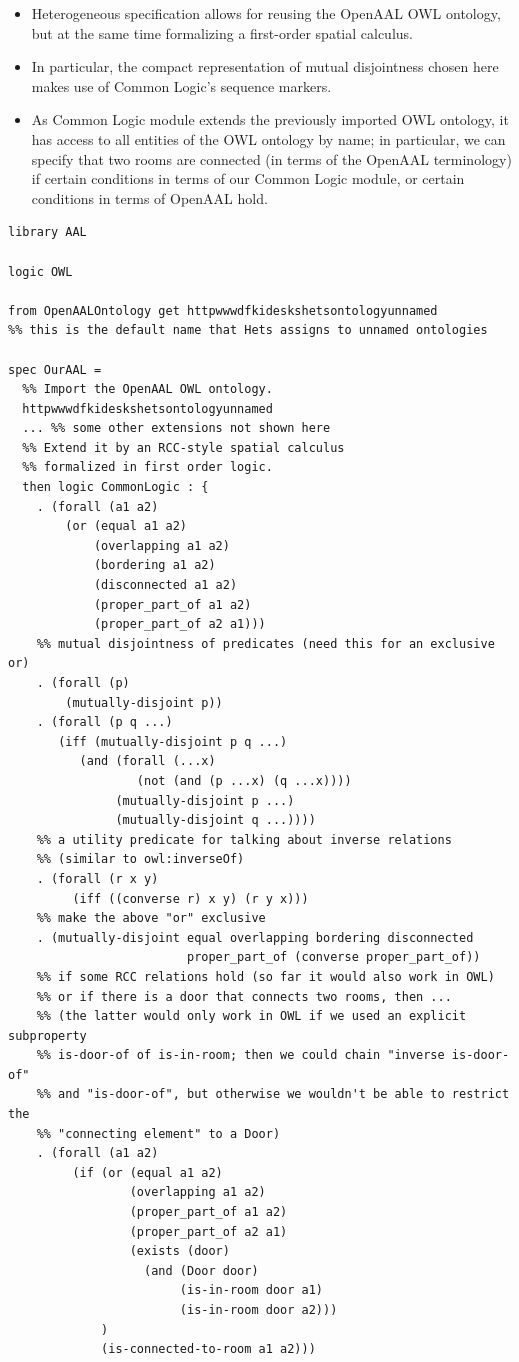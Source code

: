 \documentclass{article}
\begin{document}
\begin{itemize}
\item Heterogeneous specification allows for reusing the OpenAAL OWL ontology, but at the same time formalizing a first-order spatial calculus.
\item In particular, the compact representation of mutual disjointness chosen here makes use of Common Logic's sequence markers.
\item As Common Logic module extends the previously imported OWL ontology, it has access to all entities of the OWL ontology by name; in particular, we can specify that two rooms are connected (in terms of the OpenAAL terminology) if certain conditions in terms of our Common Logic module, or certain conditions in terms of OpenAAL hold.
\end{itemize}

\begin{lstlisting}[language=HetCASL,basicstyle={\small\ttfamily},alsolanguage=clif]
library AAL

logic OWL

from OpenAALOntology get httpwwwdfkideskshetsontologyunnamed
%% this is the default name that Hets assigns to unnamed ontologies

spec OurAAL =
  %% Import the OpenAAL OWL ontology.
  httpwwwdfkideskshetsontologyunnamed
  ... %% some other extensions not shown here
  %% Extend it by an RCC-style spatial calculus
  %% formalized in first order logic.
  then logic CommonLogic : {
    . (forall (a1 a2)
        (or (equal a1 a2)
            (overlapping a1 a2)
            (bordering a1 a2)
            (disconnected a1 a2)
            (proper_part_of a1 a2)
            (proper_part_of a2 a1)))
    %% mutual disjointness of predicates (need this for an exclusive or)
    . (forall (p)
        (mutually-disjoint p))
    . (forall (p q ...)
       (iff (mutually-disjoint p q ...)
          (and (forall (...x)
                  (not (and (p ...x) (q ...x))))
               (mutually-disjoint p ...)
               (mutually-disjoint q ...))))
    %% a utility predicate for talking about inverse relations
    %% (similar to owl:inverseOf)
    . (forall (r x y)
         (iff ((converse r) x y) (r y x)))
    %% make the above "or" exclusive
    . (mutually-disjoint equal overlapping bordering disconnected
                         proper_part_of (converse proper_part_of))
    %% if some RCC relations hold (so far it would also work in OWL)
    %% or if there is a door that connects two rooms, then ...
    %% (the latter would only work in OWL if we used an explicit subproperty
    %% is-door-of of is-in-room; then we could chain "inverse is-door-of"
    %% and "is-door-of", but otherwise we wouldn't be able to restrict the
    %% "connecting element" to a Door)
    . (forall (a1 a2)
         (if (or (equal a1 a2)
                 (overlapping a1 a2)
                 (proper_part_of a1 a2)
                 (proper_part_of a2 a1)
                 (exists (door)
                   (and (Door door)
                        (is-in-room door a1)
                        (is-in-room door a2)))
             )
             (is-connected-to-room a1 a2)))
\end{lstlisting}
\end{document}
